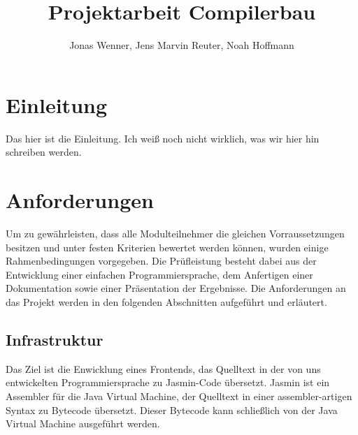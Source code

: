 \documentclass[12pt, a4paper, oneside, ngerman]{article}
\title{Projektarbeit Compilerbau}
\begin{document}
\author{Jonas Wenner, Jens Marvin Reuter, Noah Hoffmann}



\maketitle
%
%
\thispagestyle{empty}
\pagebreak

\tableofcontents
\newpage


\section{Einleitung}

Das hier ist die Einleitung. Ich weiß noch nicht wirklich, was wir hier hin schreiben werden.

\newpage

\section{Anforderungen}

Um zu gewährleisten, dass alle Modulteilnehmer die gleichen Vorraussetzungen besitzen und unter festen Kriterien bewertet werden können, wurden einige Rahmenbedingungen vorgegeben. Die Prüfleistung besteht dabei aus der Entwicklung einer einfachen Programmiersprache, dem Anfertigen einer Dokumentation sowie einer Präsentation der Ergebnisse. Die Anforderungen an das Projekt werden in den folgenden Abschnitten aufgeführt und erläutert.

\subsection{Infrastruktur}
Das Ziel ist die Enwicklung eines Frontends, das Quelltext in der von uns entwickelten Programmiersprache zu Jasmin-Code übersetzt. 
Jasmin ist ein Assembler für die Java Virtual Machine, der Quelltext in einer assembler-artigen Syntax zu Bytecode übersetzt. 
Dieser Bytecode kann schließlich von der Java Virtual Machine ausgeführt werden.
\end{document}
